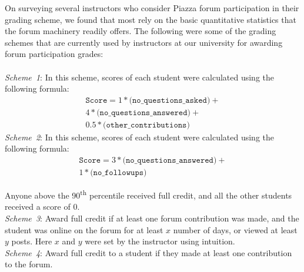 On surveying several instructors who consider Piazza forum participation in their
grading scheme, we found that most rely on
the basic quantitative statistics that the forum machinery readily
offers. The following were some of the grading schemes that are
currently used by instructors at our university for awarding forum
participation grades:\\ \\ 
\emph{Scheme~1}: In this scheme, scores of each student were calculated using the following formula:
\begin{equation}
\begin{split}
\texttt{Score} = 1 * \texttt{(no\_questions\_asked)} + 
\\ 4 * \texttt{(no\_questions\_answered)} + \\
0.5* \texttt{(other\_contributions)}
\end{split}
\end{equation}
\emph{Scheme~2}: In this scheme, scores of each student were calculated using the following formula:
\begin{equation}
\begin{split}
\texttt{Score} = 3 * \texttt{(no\_questions\_answered)} + \\ 
1* \texttt{(no\_followups)}
\end{split}
\end{equation}

Anyone above the 90\textsuperscript{th} percentile received full
credit, and all the other students received a score of
0.\\ 
\emph{Scheme~3}: Award full credit if at least one forum contribution
was made, and the student was online on the forum for at least $x$
number of days, or viewed at least $y$ posts. Here $x$ and $y$ were
set by the instructor using intuition. \\ \emph{Scheme~4}: Award full
credit to a student if they made at least one contribution to the
forum. 




